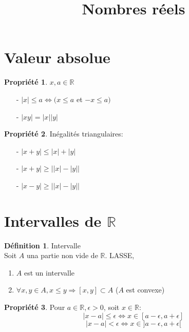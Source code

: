 \documentclass[fleqn]{article}
\title{Nombres r\'eels}
\date{}
\theoremstyle{definition} \newtheorem*{defi}{D\'efinition}
\theoremstyle{definition} \newtheorem*{theo}{Th\'eor\`eme}
\theoremstyle{definition} \newtheorem*{coro}{Corollaire}
\theoremstyle{remark} \newtheorem*{rqs}{Remarques}
\theoremstyle{definition} \newtheorem*{prop}{Propri\'et\'e}
\begin{document}
\maketitle

\section{Valeur absolue}
\begin{prop} $x,a \in \mathbb{R}$
	\begin{itemize}
		\item [-] $|x| \leq a \Leftrightarrow (x \leq a$ et $-x \leq a)$
		\item [-] $|xy| = |x||y|$
	\end{itemize}
\end{prop}
\begin{prop} In\'egalit\'es triangulaires:
	\begin{itemize}
		\item [-] $|x+y| \leq |x| + |y|$
		\item [-] $|x+y| \geq \big||x| - |y|\big|$
		\item [-] $|x-y| \geq \big||x| - |y|\big|$
	\end{itemize}
\end{prop}

\section{Intervalles de $\mathbb{R}$}
\begin{defi} Intervalle \\
	Soit $A$ una partie non vide de $\mathbb{R}$. LASSE,
	\begin{enumerate}
		\item $A$ est un intervalle
		\item $\forall x,y \in A, x \leq y \Rightarrow [x,y] \subset A$ ($A$ est convexe)
	\end{enumerate}
\end{defi}
\begin{prop}
	Pour $a \in \mathbb{R}, \epsilon > 0$, soit $x \in \mathbb{R}$:
	\[|x-a| \leq \epsilon \Leftrightarrow x \in [a - \epsilon, a + \epsilon]\]
	\[|x-a| < \epsilon \Leftrightarrow x \in ]a - \epsilon, a + \epsilon[\]
\end{prop}

\end{document}
